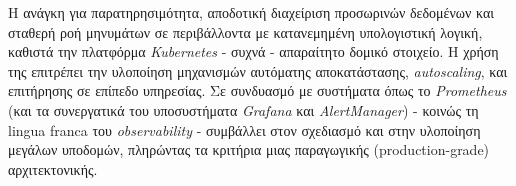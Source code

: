 Η ανάγκη για παρατηρησιμότητα, αποδοτική διαχείριση προσωρινών δεδομένων και σταθερή ροή μηνυμάτων σε περιβάλλοντα με κατανεμημένη υπολογιστική λογική, καθιστά την πλατφόρμα \textit{Kubernetes} - συχνά -  απαραίτητο δομικό στοιχείο. Η χρήση της επιτρέπει την υλοποίηση μηχανισμών αυτόματης αποκατάστασης, \textit{autoscaling}, και επιτήρησης σε επίπεδο υπηρεσίας. Σε συνδυασμό με συστήματα όπως το \textit{Prometheus} (και τα συνεργατικά του υποσυστήματα \textit{Grafana} και \textit{AlertManager}) \cite{inframon} - κοινώς τη lingua franca του \textit{observability} - συμβάλλει στον σχεδιασμό και στην υλοποίηση μεγάλων υποδομών, πληρώντας τα κριτήρια μιας παραγωγικής (production-grade) αρχιτεκτονικής.
